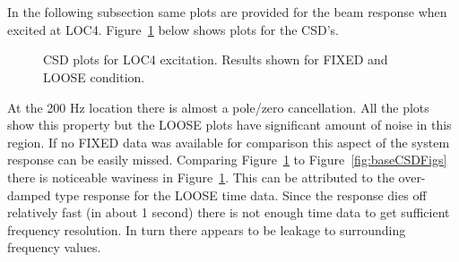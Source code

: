 \documentclass[paper=a4, fontsize=12pt]{scrartcl} %
\begin{document}
%
\\
\\
In the following subsection same plots are provided for the beam response when excited at LOC4. Figure~\ref{fig:LOC4CSDFigs} below shows plots for the CSD's.
%
	\begin{figure}[H]
		\centering
		\quad
		\quad
		\quad
		\caption{CSD plots for LOC4 excitation. Results shown for FIXED and LOOSE condition.}
		\label{fig:LOC4CSDFigs}
	\end{figure}
%
At the 200 Hz location there is almost a pole/zero cancellation. All the plots show this property but the LOOSE plots have significant amount of noise in this region. If no FIXED data was available for comparison this aspect of the system response can be easily missed. Comparing Figure~\ref{fig:LOC4CSDFigs} to Figure~\ref{fig:baseCSDFigs} there is noticeable waviness in Figure~\ref{fig:LOC4CSDFigs}. This can be attributed to the over-damped type response for the LOOSE time data. Since the response dies off relatively fast (in about 1 second) there is not enough time data to get sufficient frequency resolution. In turn there appears to be leakage to surrounding frequency values.
\end{document}
